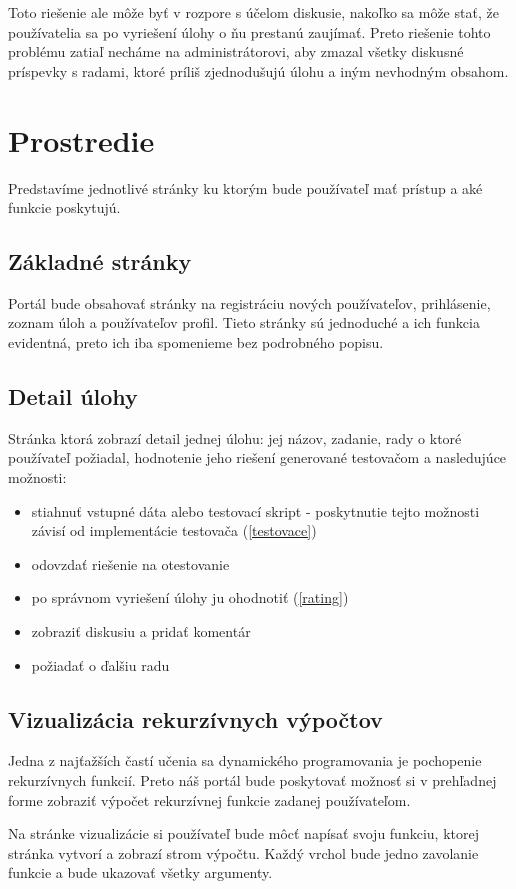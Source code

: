 Toto riešenie ale môže byť v rozpore s účelom diskusie, nakoľko sa môže stať, že používatelia sa po vyriešení úlohy
o ňu prestanú zaujímať. Preto riešenie tohto problému zatiaľ necháme na administrátorovi, aby zmazal všetky diskusné
príspevky s radami, ktoré príliš zjednodušujú úlohu a iným nevhodným obsahom.
\section{Prostredie}
Predstavíme jednotlivé stránky ku ktorým bude používateľ mať prístup a aké
funkcie poskytujú.

\subsection{Základné stránky}
Portál bude obsahovať stránky na registráciu nových používateľov, prihlásenie, zoznam úloh a
používateľov profil. Tieto stránky sú jednoduché a ich funkcia evidentná, preto ich iba spomenieme
bez podrobného popisu.

\subsection{Detail úlohy}
Stránka ktorá zobrazí detail jednej úlohu: jej názov, zadanie, rady o ktoré používateľ požiadal, hodnotenie jeho riešení
generované testovačom a nasledujúce možnosti:
\begin{itemize}
  \item stiahnuť vstupné dáta alebo testovací skript - poskytnutie tejto možnosti závisí od implementácie testovača (\ref{testovace})
  \item odovzdať riešenie na otestovanie
  \item po správnom vyriešení úlohy ju ohodnotiť (\ref{rating})
  \item zobraziť diskusiu a pridať komentár
  \item požiadať o ďalšiu radu
\end{itemize}

\subsection{Vizualizácia rekurzívnych výpočtov}
Jedna z najťažších častí učenia sa dynamického programovania je pochopenie rekurzívnych funkcií.
Preto náš portál bude poskytovať možnosť si v prehľadnej forme zobraziť výpočet
rekurzívnej funkcie zadanej používateľom.

Na stránke vizualizácie si používateľ bude môcť napísať svoju funkciu, ktorej stránka vytvorí
a zobrazí strom výpočtu. Každý vrchol bude jedno zavolanie funkcie a bude ukazovať všetky argumenty.

